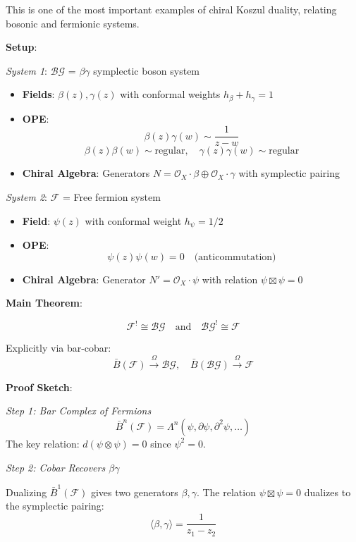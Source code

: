 \begin{example}
\begin{example}
This is one of the most important examples of chiral Koszul duality, relating bosonic and fermionic systems.

\textbf{Setup}:

\textit{System 1}: $\mathcal{BG}$ = $\beta\gamma$ symplectic boson system
\begin{itemize}
\item \textbf{Fields}: $\beta(z), \gamma(z)$ with conformal weights $h_\beta + h_\gamma = 1$
\item \textbf{OPE}:
$$\beta(z)\gamma(w) \sim \frac{1}{z-w}$$
$$\beta(z)\beta(w) \sim \text{regular}, \quad \gamma(z)\gamma(w) \sim \text{regular}$$
\item \textbf{Chiral Algebra}: Generators $N = \mathcal{O}_X \cdot \beta \oplus \mathcal{O}_X \cdot \gamma$ with symplectic pairing
\end{itemize}

\textit{System 2}: $\mathcal{F}$ = Free fermion system
\begin{itemize}
\item \textbf{Field}: $\psi(z)$ with conformal weight $h_\psi = 1/2$
\item \textbf{OPE}: 
$$\psi(z)\psi(w) = 0 \quad \text{(anticommutation)}$$
\item \textbf{Chiral Algebra}: Generator $N' = \mathcal{O}_X \cdot \psi$ with relation $\psi \boxtimes \psi = 0$
\end{itemize}

\textbf{Main Theorem}:

\begin{theorem}
$$\mathcal{F}^! \cong \mathcal{BG} \quad \text{and} \quad \mathcal{BG}^! \cong \mathcal{F}$$

Explicitly via bar-cobar:
$$\bar{B}(\mathcal{F}) \xrightarrow{\Omega} \mathcal{BG}, \quad \bar{B}(\mathcal{BG}) \xrightarrow{\Omega} \mathcal{F}$$
\end{theorem}

\textbf{Proof Sketch}:

\textit{Step 1: Bar Complex of Fermions}
$$\bar{B}^n(\mathcal{F}) = \Lambda^n(\psi, \partial\psi, \partial^2\psi, \ldots)$$
The key relation: $d(\psi \otimes \psi) = 0$ since $\psi^2=0$.

\textit{Step 2: Cobar Recovers $\beta\gamma$}

Dualizing $\bar{B}^1(\mathcal{F})$ gives two generators $\beta, \gamma$.
The relation $\psi \boxtimes \psi = 0$ dualizes to the symplectic pairing:
$$\langle \beta, \gamma \rangle = \frac{1}{z_1-z_2}$$


\end{example}
\end{example}
